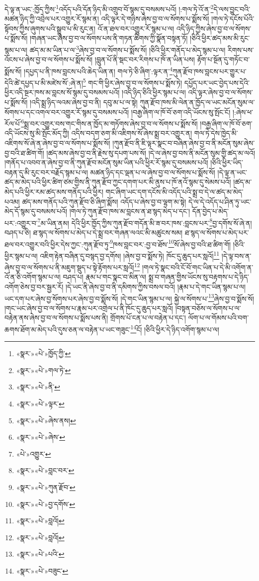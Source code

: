 དེ་ལྟ་ན་ཡང་:ཁྱོད་ཀྱིས་\footnote{«སྣར་»«པེ་»ཁྱོད་ཀྱི་}འདོད་པའི་དོན་ཉིད་མི་འགྲུབ་བོ་སྙམ་དུ་བསམས་པའོ། །:གལ་ཏེ་འོ་ན་\footnote{«སྣར་»«པེ་»གལ་ཏེ་}དེ་ལས་བྱུང་བའི་མཚན་ཉིད་ཀྱི་འབྲེལ་པར་འགྱུར་རོ་སྙམ་ན། འདི་ལྟར་དེ་གཉིས་ཞེས་བྱ་བ་ལ་སོགས་པ་སྨོས་སོ། །གལ་ཏེ་དངོས་པོའི་སྟོབས་ཀྱིས་ཞུགས་པའི་སྒྲུབ་པ་མི་རུང་ན། འོ་ན་ཐལ་བར་འགྱུར་རོ་སྙམ་པ་ལ། འདི་ཉིད་ཀྱིས་ཞེས་བྱ་བ་ལ་སོགས་པ་སྨོས་སོ། །གཞན་ཡང་ཞེས་བྱ་བ་ལ་སོགས་པས་ནི་གཏན་ཚིགས་ཀྱི་སྣོན་བསྟན་ཏོ། །ཅིའི་ཕྱིར་ཚད་མས་མི་རུང་སྙམ་པ་ལ། ཚད་མ་མ་ཡིན་པ་ལ་\footnote{«སྣར་»«པེ་»ནི་}ཞེས་བྱ་བ་ལ་སོགས་པ་སྨོས་སོ། །ཅིའི་ཕྱིར་གནོད་པ་མེད་སྙམ་པ་ལ། རིགས་པས་འོངས་པ་ཞེས་བྱ་བ་ལ་སོགས་པ་སྨོས་སོ། །བླུན་པོ་ནི་སྡང་བར་རིགས་པ་ཁོ་ན་ཡིན་པས། རྟོག་པ་སྔོན་དུ་གཏོང་བ་སྨོས་སོ། །དཔྱད་པ་ནི་ཁས་བླངས་པའི་ཆེད་ཡིན་ན། གལ་ཏེ་ཅི་ཞིག་:ལྟར་ན་\footnote{«སྣར་»«པེ་»ལྟར་}ཀུན་རྫོབ་ཁས་བླངས་པར་གྱུར་པ་དེའི་ཚེ་དཔྱད་པ་མི་མཛེས་སོ་:ཞེ་ན།\footnote{«སྣར་»«པེ་»ཞེས་ནས།} གང་གི་ཕྱིར་ཞེས་བྱ་བ་ལ་སོགས་པ་སྨོས་ཏེ། དཔྱོད་པར་ཡང་བྱེད་པས་དེའི་ཕྱིར་འདི་སྔར་ཁས་མ་བླངས་སོ་སྙམ་དུ་བསམས་པའོ། །འདི་ཉིད་ཅིའི་ཕྱིར་སྙམ་པ་ལ། འདི་ལྟར་ཞེས་བྱ་བ་ལ་སོགས་པ་སྨོས་སོ། །འདི་སྨྲ་ཉིད་ལའམ་ཞེས་བྱ་བ་ནི། དབུ་མ་པ་ལ་སྟེ། ཀུན་རྫོབ་ཁས་མི་ལེན་ན་ཁྱོད་ལ་ཡང་མངོན་སུམ་ལ་སོགས་པ་དང་འགལ་བར་འགྱུར་རོ་སྙམ་དུ་བསམས་པའོ། །བརྒྱ་ཞིག་ལ་ཁོ་བོ་ཅག་འདི་ཡོངས་སུ་སྤོང་ངོ། །:ཞེས་ཕ་རོལ་པོ་\footnote{«སྣར་»«པེ་»ཞེས་}སྨྲ་བར་འགྱུར་བས་གང་གིས་ན་ཁྱོད་མ་གཏོགས་ཞེས་བྱ་བ་ལ་སོགས་པ་སྨོས་སོ། །བརྒྱ་ཞིག་ལ་ཁོ་བོ་ཅག་འདི་ཡོངས་སུ་མི་སྤོང་མོད་ཀྱི། འདིས་བདག་ཅག་མི་འཇིགས་སོ་ཞེས་སྨྲ་བར་འགྱུར་ན། གལ་ཏེ་དེས་ཁྱེད་མི་འཇིགས་སོ་ཞེ་ན་ཞེས་བྱ་བ་ལ་སོགས་པ་སྨོས་སོ། །ཀུན་རྫོབ་ནི་ཇི་ལྟར་སྣང་བ་བཞིན་ཞེས་བྱ་བ་ནི་མངོན་སུམ་ཞེས་བྱ་བའི་ཐ་ཚིག་གོ། །ཚད་མས་ཞེས་བྱ་བ་ནི་རྗེས་སུ་དཔག་པས་སོ། །དེ་ལ་ཞེས་བྱ་བས་ནི་མངོན་སུམ་གྱི་ཚད་མ་ལའོ། །གནོད་པ་འབབ་ན་ཞེས་བྱ་བ་ནི་ཀུན་རྫོབ་མངོན་སུམ་ཡིན་པའི་ཕྱིར་རོ་སྙམ་དུ་བསམས་པའོ། །ཅིའི་ཕྱིར་ཡིད་བརྟན་དུ་མི་རུང་བར་བརྗོད་སྙམ་པ་ལ། མཚན་ཉིད་དང་ལྡན་པ་ལ་ཞེས་བྱ་བ་ལ་སོགས་པ་སྨོས་སོ། །དེ་ལྟ་ན་ཡང་ཚད་མ་མེད་པའི་ཕྱིར་ཚིག་ཙམ་གྱིས་ནི་ཀུན་རྫོབ་ཀྱང་དགག་པར་མི་ནུས་པ་ཁོ་ནའོ་སྙམ་དུ་སེམས་པའོ། །ཚད་མ་མེད་པའི་ཕྱིར་རམ་ཚད་མས་གནོད་པའི་ཕྱིར། གང་ཞིག་ཡང་དག་དངོས་མི་འདོད་པའི་སྨྲ་བ་དེ་ལ་ཚད་མ་མེད་པའམ། ཚད་མས་གནོད་པའི་ཀུན་རྫོབ་ཅི་ཞིག་སྨོས། འདོད་པ་ཞེས་བྱ་བ་ལྷག་མ་སྟེ། དེ་ལ་དེ་འདོད་པ་ཤིན་ཏུ་ཡང་མེད་དོ་སྙམ་དུ་བསམས་པའོ། །གལ་ཏེ་ཀུན་རྫོབ་ཁས་མ་བླངས་ན་ཐ་སྙད་མེད་པ་དང་། དོན་བྱེད་པ་མེད་པར་:འགྱུར་བ་\footnote{«པེ་»འགྱུར་}མ་ཡིན་ནམ། དེའི་ཕྱིར་ཁྱོད་ཀྱིས་ཀུན་རྫོབ་གདོན་མི་ཟ་བར་ཁས་:བླངས་པར་\footnote{«སྣར་»«པེ་»བླང་བར་}བྱ་དགོས་སོ་ཞེ་ན། བཤད་པ་ཅི། ཐ་སྙད་ལ་སོགས་པ་མེད་པ་དེ་སྨྲ་བར་གཞན་ལའང་མི་མཚུངས་སམ། ཐ་སྙད་ལ་སོགས་པ་མེད་པར་ཐལ་བར་འགྱུར་བའི་ཕྱིར་དེས་ཀྱང་:ཀུན་རྫོབ་ཏུ་\footnote{«སྣར་»«པེ་»ཀུན་རྫོབ་}ཁས་བླང་བར་:བྱ་བ་ཐོས་\footnote{«སྣར་»«པེ་»བྱ་དགོས་}སོ་ཞེས་བྱ་བའི་ཐ་ཚིག་གོ། །ཅིའི་ཕྱིར་སྙམ་པ་ལ། འཇིག་རྟེན་བཞིན་དུ་བསྙད་བྱ་དགོས། །ཞེས་བྱ་བ་སྨོས་ཏེ། ཁོང་དུ་ཆུད་པར་སླའོ།\footnote{«སྣར་»«པེ་»བླའོ།} །དེ་ལྟ་བས་ན་ཞེས་བྱ་བ་ལ་སོགས་པ་ནི་མཇུག་སྡུད་པ་སྟེ་རྟོགས་པར་སླའོ།\footnote{«སྣར་»«པེ་»བླའོ།} །གལ་ཏེ་སྣང་བའི་ངོ་བོ་གང་ཡིན་པ་དེ་མི་འགོག་ན་འོ་ན་ཅི་འགོག་སྙམ་པ་ལ། བཤད་པ། རྣམ་པ་གང་སྣང་བ་མིན་ལ། སྨྲ་བ་གཞན་གྱིས་ཡོངས་སུ་བརྟགས་པ་དེ་ཉིད་འགོག་ཅེས་བྱ་བར་སྦྱར་རོ། །དེ་ཡང་ནི་ཞེས་བྱ་བ་ནི་དམིགས་ཀྱིས་བསལ་བའོ། །རྣམ་པ་དེ་གང་ཡིན་སྙམ་པ་ལ། ཡང་དག་པར་ཞེས་བྱ་སོགས་པར་ཞེས་བྱ་བ་སྨོས་སོ། །དེ་གང་ཡིན་སྙམ་པ་ལ། སྐྱེ་ལ་སོགས་པ་\footnote{«སྣར་»«པེ་»པའི་}ཞེས་བྱ་བ་སྨོས་སོ། །གང་ཡང་ཞེས་བྱ་བ་ལ་སོགས་པ་རྣམ་པར་འགྲེལ་པ་ནི་ཁོང་དུ་ཆུད་པར་སླའོ། །བསྟན་བཅོས་ལ་སོགས་པ་ལ་བརྟེན་ནས་ཞེས་བྱ་བ་ལ་སོགས་པ་སྨོས་པས་ནི། གྲོགས་པོ་ངན་པ་ལ་བརྟེན་པ་དང་། ལོག་པ་ལ་གོམས་པའི་བག་ཆགས་ཐོག་མ་མེད་པའི་དུས་ཅན་ལ་བརྟེན་པ་ཡང་གཟུང་\footnote{«སྣར་»«པེ་»བཟུང་}ངོ། །ཅིའི་ཕྱིར་དེ་ཉིད་འགོག་སྙམ་པ་ལ། 
